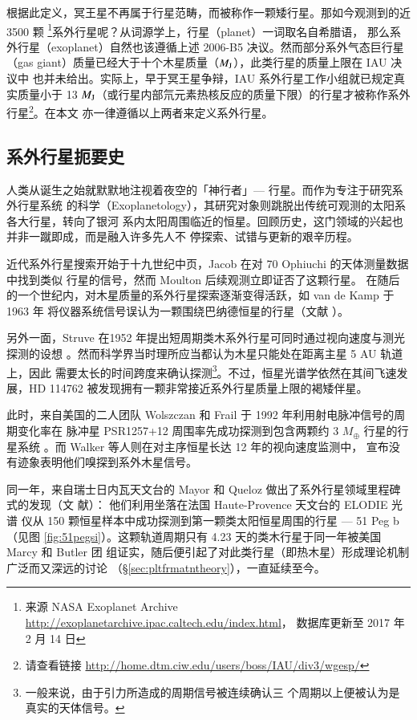 根据此定义，冥王星不再属于行星范畴，而被称作一颗矮行星。那如今观测到的近 3500 颗
\footnote{来源 NASA Exoplanet Archive \url{http://exoplanetarchive.ipac.caltech.edu/index.html}，
数据库更新至 2017 年 2 月 14 日}系外行星呢？从词源学上，行星（planet）一词取名自希腊语，
那么系外行星（exoplanet）自然也该遵循上述 2006-B5 决议。然而部分系外气态巨行星
（gas giant）质量已经大于十个木星质量（$M_\mathrm{J}$），此类行星的质量上限在 IAU 决议中
也并未给出。实际上，早于冥王星争辩，IAU 系外行星工作小组就已规定真实质量小于 13 
$M_\mathrm{J}$（或行星内部氘元素热核反应的质量下限\cite{Baraffe2003}）的行星才被称作系外
行星\footnote{请查看链接 \url{http://home.dtm.ciw.edu/users/boss/IAU/div3/wgesp/}}。在本文
亦一律遵循以上两者来定义系外行星。


\subsection{系外行星扼要史} 

人类从诞生之始就默默地注视着夜空的「神行者」--- 行星。而作为专注于研究系外行星系统
的科学（Exoplanetology），其研究对象则跳脱出传统可观测的太阳系各大行星，转向了银河
系内太阳周围临近的恒星。回顾历史，这门领域的兴起也并非一蹴即成，而是融入许多先人不
停探索、试错与更新的艰辛历程。

近代系外行星搜索开始于十九世纪中页，Jacob 在对 70 Ophiuchi 的天体测量数据中找到类似
行星的信号\cite{Jacob1855}，然而 Moulton 后续观测立即证否了这颗行星\cite{Moulton1899}。
在随后的一个世纪内，对木星质量的系外行星探索逐渐变得活跃，如 van de Kamp 于 1963 年
将仪器系统信号误认为一颗围绕巴纳德恒星的行星（文献 ）。

另外一面，Struve 在1952 年提出短周期类木系外行星可同时通过视向速度与测光探测的设想
\cite{Struve1952}。然而科学界当时理所应当都认为木星只能处在距离主星 5 AU 轨道上，因此
需要太长的时间跨度来确认探测\footnote{一般来说，由于引力所造成的周期信号被连续确认三
个周期以上便被认为是真实的天体信号。}。不过，恒星光谱学依然在其间飞速发展，HD 114762 
被发现拥有一颗非常接近系外行星质量上限的褐矮伴星\cite{Latham1989}。

此时，来自美国的二人团队 Wolszczan 和 Frail 于 1992 年利用射电脉冲信号的周期变化率在
脉冲星 PSR1257+12 周围率先成功探测到包含两颗约 3 $M_\oplus$ 行星的行星系统
\cite{WolszczanFrail1992}。而 Walker 等人则在对主序恒星长达 12 年的视向速度监测中，
宣布没有迹象表明他们嗅探到系外木星信号\cite{Walkeretal1995}。

同一年，来自瑞士日内瓦天文台的 Mayor 和 Queloz 做出了系外行星领域里程碑式的发现（文
献）： 他们利用坐落在法国 Haute-Provence 天文台的 ELODIE 光谱
仪从 150 颗恒星样本中成功探测到第一颗类太阳恒星周围的行星  --- 51 Peg b（见图 
\ref{fig:51pegsi}）。这颗轨道周期只有 4.23 天的类木行星于同一年被美国 Marcy 和 Butler 团
组证实，随后便引起了对此类行星（即热木星）形成理论机制广泛而又深远的讨论
（\S \ref{sec:pltfrmatntheory}），一直延续至今。

